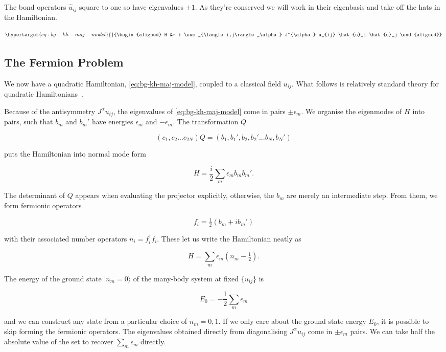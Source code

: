 The bond operators \(\hat{u}_{ij}\) square to one so have eigenvalues \(\pm1\). As they're conserved we will work in their eigenbasis and take off the hats in the Hamiltonian.

\begin{equation}\protect\hypertarget{eq:bg-kh-maj-model}{}{\begin{aligned}
H &=  i \sum_{\langle i,j\rangle_\alpha} J^{\alpha} u_{ij} \hat{c}_i \hat{c}_j
\end{aligned}}\label{eq:bg-kh-maj-model}\end{equation}

\hypertarget{the-fermion-problem}{%
\subsection{The Fermion Problem}\label{the-fermion-problem}}

We now have a quadratic Hamiltonian, \cref{eq:bg-kh-maj-model}, coupled to a classical field \(u_{ij}\). What follows is relatively standard theory for quadratic Hamiltonians~\autocite{BlaizotRipka1986}.

Because of the antisymmetry \(J^{\alpha} u_{ij}\), the eigenvalues of \cref{eq:bg-kh-maj-model} come in pairs \(\pm \epsilon_m\). We organise the eigenmodes of \(H\) into pairs, such that \(b_m\) and \(b_m'\) have energies \(\epsilon_m\) and \(-\epsilon_m\). The transformation \(Q\)

\[(c_1, c_2... c_{2N}) Q = (b_1, b_1', b_2, b_2' ... b_{N}, b_{N}')\]

puts the Hamiltonian into normal mode form

\[H = \frac{i}{2} \sum_m \epsilon_m b_m b_m'.\]

The determinant of \(Q\) appears when evaluating the projector explicitly, otherwise, the \(b_m\) are merely an intermediate step. From them, we form fermionic operators

\[ f_i = \tfrac{1}{2} (b_m + ib_m')\]

with their associated number operators \(n_i = f^\dagger_i f_i\). These let us write the Hamiltonian neatly as

\[ H = \sum_m \epsilon_m (n_m - \tfrac{1}{2}).\]

The energy of the ground state \(|n_m = 0\rangle\) of the many-body system at fixed \(\{u_{ij}\}\) is

\[E_{0} = -\frac{1}{2}\sum_m \epsilon_m \]

and we can construct any state from a particular choice of \(n_m = 0,1\). If we only care about the ground state energy \(E_{0}\), it is possible to skip forming the fermionic operators. The eigenvalues obtained directly from diagonalising \(J^{\alpha} u_{ij}\) come in \(\pm \epsilon_m\) pairs. We can take half the absolute value of the set to recover \(\sum_m \epsilon_m\) directly.


